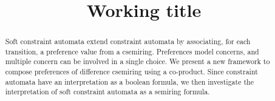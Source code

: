 \title{Working title}

\author{ }

\institute{ }

\maketitle

\begin{abstract}
	Soft constraint automata extend constraint automata by associating, for each transition, a preference value from a csemiring. Preferences model concerns, and multiple concern can be involved in a single choice. We present a new framework to compose preferences of difference csemiring using a co-product. Since constraint automata have an interpretation as a boolean formula, we then investigate the interpretation of soft constraint automata as a semiring formula. 
	
	
\end{abstract}